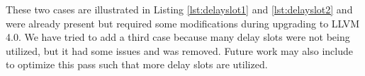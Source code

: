 These two cases are illustrated in Listing \ref{lst:delayslot1} and \ref{lst:delayslot2} and were already present but required some modifications during upgrading to LLVM 4.0. We have tried to add a third case because many delay slots were not being utilized, but it had some issues and was removed. Future work may also include to optimize this pass such that more delay slots are utilized.


